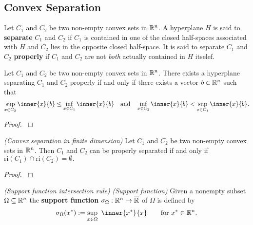 \begin{definition}
\section{Convex Separation}
\begin{definition}
  Let 
  $C_1$ and $C_2$
  be two non-empty convex sets in $\mathbb{R}^n$. 
  A hyperplane $H$ is said to \textbf{separate}
  $C_1$ and $C_2$
  if $C_1$ is contained in one of the closed half-spaces associated with
  $H$ and $C_2$ lies in the opposite closed half-space. It is said to separate 
  $C_1$ and $C_2$
  \textbf{properly} if 
  $C_1$ and $C_2$
  are not \textit{both} actually contained in $H$ itselef.
\end{definition}
\begin{theorem}
  Let $C_1$ and $C_2$ be two non-empty convex sets in $\mathbb{R}^n$. 
  There exists a hyperplane separating
  $C_1$ and $C_2$
  properly 
  if and only if
  there exists a vector $b\in \mathbb{R}^n$ such that
  \begin{gather}
    \sup_{x\in C_2} \inner{x}{b}
    \le
    \inf_{x\in C_1} \inner{x}{b}
    \quad 
    \text{and}
    \quad 
    \inf_{x\in C_2} \inner{x}{b}
    <
    \sup_{x\in C_1} \inner{x}{b}
    .
  \end{gather}
\end{theorem}
\begin{proof}
  \cite[Theorem~11.1]{Rockafellar1970}
\end{proof}
\begin{ftheorem}
  \emph{(Convex separation in finite dimension)}
  Let $C_1$ and $C_2$ be two non-empty convex sets in $\mathbb{R}^n$. 
  Then $C_1$ and $C_2$ can be properly separated if and only if 
  $\mathrm{ri}(C_1)\cap\mathrm{ri}(C_2)=\emptyset.$
\end{ftheorem}
\begin{proof}
  \cite[Theorem~11.3]{Rockafellar1970}
\end{proof}
\end{definition}
\begin{definition}
  \emph{(Support function intersection rule)}
  \emph{(Support function)}
  Given a nonempty subset 
  $\Omega \subseteq \mathbb{R}^n$
  the \textbf{support function} 
  $
  \sigma_\Omega : \mathbb{R}^n \to \overline{\mathbb{R}}
  $
  of $\Omega$
  is defined by
  \begin{gather}
    \sigma_\Omega
    (x^*)
    :=
    \sup_{x \in \Omega}
    \ 
    \inner{x^*}{x}
    \qquad
    \text{for}\ 
    x^* \in \R^n
    .
  \end{gather}
\end{definition}
